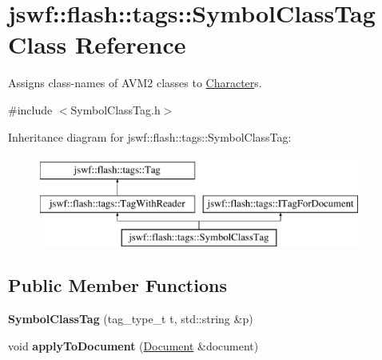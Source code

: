 \hypertarget{classjswf_1_1flash_1_1tags_1_1_symbol_class_tag}{\section{jswf\+:\+:flash\+:\+:tags\+:\+:Symbol\+Class\+Tag Class Reference}
\label{classjswf_1_1flash_1_1tags_1_1_symbol_class_tag}
}


Assigns class-\/names of A\+V\+M2 classes to {\ttfamily \hyperlink{classjswf_1_1flash_1_1_character}{Character}}s.  




{\ttfamily \#include $<$Symbol\+Class\+Tag.\+h$>$}

Inheritance diagram for jswf\+:\+:flash\+:\+:tags\+:\+:Symbol\+Class\+Tag\+:\begin{figure}[H]
\begin{center}
\leavevmode
\includegraphics[height=3.000000cm]{classjswf_1_1flash_1_1tags_1_1_symbol_class_tag}
\end{center}
\end{figure}
\subsection*{Public Member Functions}
\begin{DoxyCompactItemize}
\item 
\hypertarget{classjswf_1_1flash_1_1tags_1_1_symbol_class_tag_a452916e18c6da20b03e43379ba173f47}{{\bfseries Symbol\+Class\+Tag} (tag\+\_\+type\+\_\+t t, std\+::string \&p)}\label{classjswf_1_1flash_1_1tags_1_1_symbol_class_tag_a452916e18c6da20b03e43379ba173f47}

\item 
\hypertarget{classjswf_1_1flash_1_1tags_1_1_symbol_class_tag_a2d0fff5f0a0757b41f2104f157b00c28}{void {\bfseries apply\+To\+Document} (\hyperlink{classjswf_1_1flash_1_1_document}{Document} \&document)}\label{classjswf_1_1flash_1_1tags_1_1_symbol_class_tag_a2d0fff5f0a0757b41f2104f157b00c28}

\end{DoxyCompactItemize}
